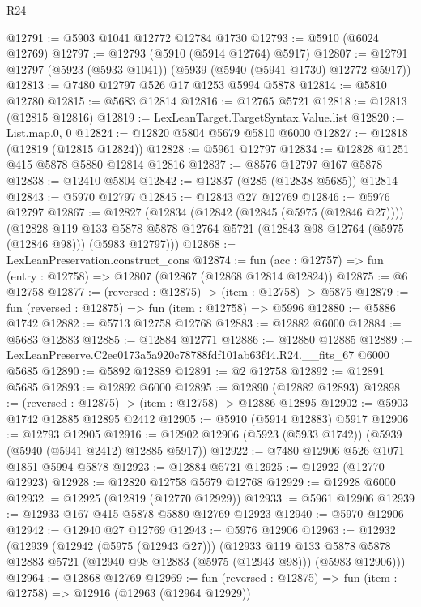 \begin{lexlean}{R24}
\begin{coremodule}
@12791 := @5903 @1041 @12772 @12784 @1730
@12793 := @5910 (@6024 @12769)
@12797 := @12793 (@5910 (@5914 @12764) @5917)
@12807 := @12791 @12797 (@5923 (@5933 @1041)) (@5939 (@5940 (@5941 @1730) @12772 @5917))
@12813 := @7480 @12797 @526 @17 @1253 @5994 @5878
@12814 := @5810 @12780
@12815 := @5683 @12814
@12816 := @12765 @5721
@12818 := @12813 (@12815 @12816)
@12819 := LexLeanTarget.TargetSyntax.Value.list
@12820 := List.map.{0, 0}
@12824 := @12820 @5804 @5679 @5810 @6000
@12827 := @12818 (@12819 (@12815 @12824))
@12828 := @5961 @12797
@12834 := @12828 @1251 @415 @5878 @5880 @12814 @12816
@12837 := @8576 @12797 @167 @5878
@12838 := @12410 @5804
@12842 := @12837 (@285 (@12838 @5685)) @12814
@12843 := @5970 @12797
@12845 := @12843 @27 @12769
@12846 := @5976 @12797
@12867 := @12827
    (@12834
      (@12842 (@12845 (@5975 (@12846 @27))))
      (@12828
        @119
        @133
        @5878
        @5878
        @12764
        @5721
        (@12843 @98 @12764 (@5975 (@12846 @98)))
        (@5983 @12797)))
@12868 := LexLeanPreservation.construct_cons
@12874 := fun (acc : @12757) => fun (entry : @12758) => @12807 (@12867 (@12868 @12814 @12824))
@12875 := @6 @12758
@12877 := (reversed : @12875) -> (item : @12758) -> @5875
@12879 := fun (reversed : @12875) => fun (item : @12758) => @5996
@12880 := @5886 @1742
@12882 := @5713 @12758 @12768
@12883 := @12882 @6000
@12884 := @5683 @12883
@12885 := @12884 @12771
@12886 := @12880 @12885
@12889 := LexLeanPreserve.C2ee0173a5a920c78788fdf101ab63f44.R24.__fits_67 @6000 @5685
@12890 := @5892 @12889
@12891 := @2 @12758
@12892 := @12891 @5685
@12893 := @12892 @6000
@12895 := @12890 (@12882 @12893)
@12898 := (reversed : @12875) -> (item : @12758) -> @12886 @12895
@12902 := @5903 @1742 @12885 @12895 @2412
@12905 := @5910 (@5914 @12883) @5917
@12906 := @12793 @12905
@12916 := @12902 @12906 (@5923 (@5933 @1742)) (@5939 (@5940 (@5941 @2412) @12885 @5917))
@12922 := @7480 @12906 @526 @1071 @1851 @5994 @5878
@12923 := @12884 @5721
@12925 := @12922 (@12770 @12923)
@12928 := @12820 @12758 @5679 @12768
@12929 := @12928 @6000
@12932 := @12925 (@12819 (@12770 @12929))
@12933 := @5961 @12906
@12939 := @12933 @167 @415 @5878 @5880 @12769 @12923
@12940 := @5970 @12906
@12942 := @12940 @27 @12769
@12943 := @5976 @12906
@12963 := @12932
    (@12939
      (@12942 (@5975 (@12943 @27)))
      (@12933
        @119
        @133
        @5878
        @5878
        @12883
        @5721
        (@12940 @98 @12883 (@5975 (@12943 @98)))
        (@5983 @12906)))
@12964 := @12868 @12769
@12969 := fun (reversed : @12875) => fun (item : @12758) => @12916 (@12963 (@12964 @12929))

\end{coremodule}
\end{lexlean}
